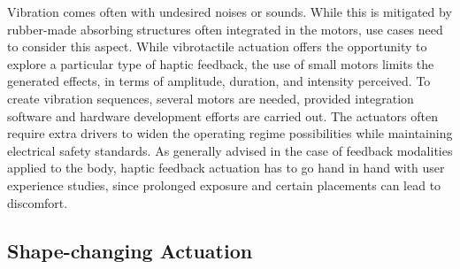 Vibration comes often with undesired noises or sounds. While this is mitigated by rubber-made absorbing structures often integrated in the motors, use cases need to consider this aspect. While vibrotactile actuation offers the opportunity to explore a particular type of haptic feedback, the use of small motors limits the generated effects, in terms of amplitude, duration, and intensity perceived. To create vibration sequences, several motors are needed, provided integration software and hardware development efforts are carried out. The actuators often require extra drivers to widen the operating regime possibilities while maintaining electrical safety standards. As generally advised in the case of feedback modalities applied to the body, haptic feedback actuation has to go hand in hand with user experience studies, since prolonged exposure and certain placements can lead to discomfort.


\subsection*{Shape-changing Actuation}


